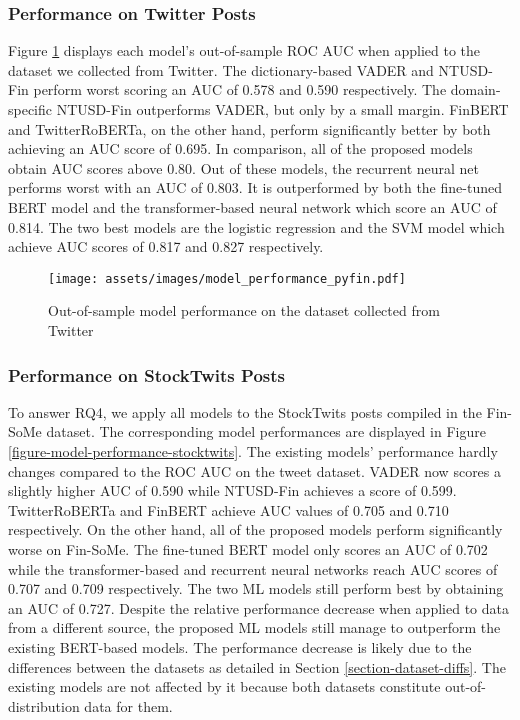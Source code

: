 




\subsubsection{Performance on Twitter Posts}
Figure \ref{figure-model-performance-twitter} displays each model's out-of-sample ROC AUC when applied to the dataset we collected from Twitter. The dictionary-based VADER and NTUSD-Fin perform worst scoring an AUC of 0.578 and 0.590 respectively. The domain-specific NTUSD-Fin outperforms VADER, but only by a small margin. FinBERT and TwitterRoBERTa, on the other hand, perform significantly better by both achieving an AUC score of 0.695.\newline
In comparison, all of the proposed models obtain AUC scores above 0.80. Out of these models, the recurrent neural net performs worst with an AUC of 0.803. It is outperformed by both the fine-tuned BERT model and the transformer-based neural network which score an AUC of 0.814. The two best models are the logistic regression and the SVM model which achieve AUC scores of 0.817 and 0.827 respectively.


\begin{figure}[!ht]
	\texttt{[image: assets/images/model\_performance\_pyfin.pdf]}	
	\caption{Out-of-sample model performance on the dataset collected from Twitter}
	\label{figure-model-performance-twitter}
\end{figure}



\subsubsection{Performance on StockTwits Posts}
\label{section-modelperf-on-finsome}
To answer RQ4, we apply all models to the StockTwits posts compiled in the Fin-SoMe dataset. The corresponding model performances are displayed in Figure \ref{figure-model-performance-stocktwits}. The existing models' performance hardly changes compared to the ROC AUC on the tweet dataset. VADER now scores a slightly higher AUC of 0.590 while NTUSD-Fin achieves a score of 0.599. TwitterRoBERTa and FinBERT achieve AUC values of 0.705 and 0.710 respectively. On the other hand, all of the proposed models perform significantly worse on Fin-SoMe. The fine-tuned BERT model only scores an AUC of 0.702 while the transformer-based and recurrent neural networks reach AUC scores of 0.707 and 0.709 respectively. The two ML models still perform best by obtaining an AUC of 0.727. Despite the relative performance decrease when applied to data from a different source, the proposed ML models still manage to outperform the existing BERT-based models. The performance decrease is likely due to the differences between the datasets as detailed in Section \ref{section-dataset-diffs}. The existing models are not affected by it because both datasets constitute out-of-distribution data for them.

